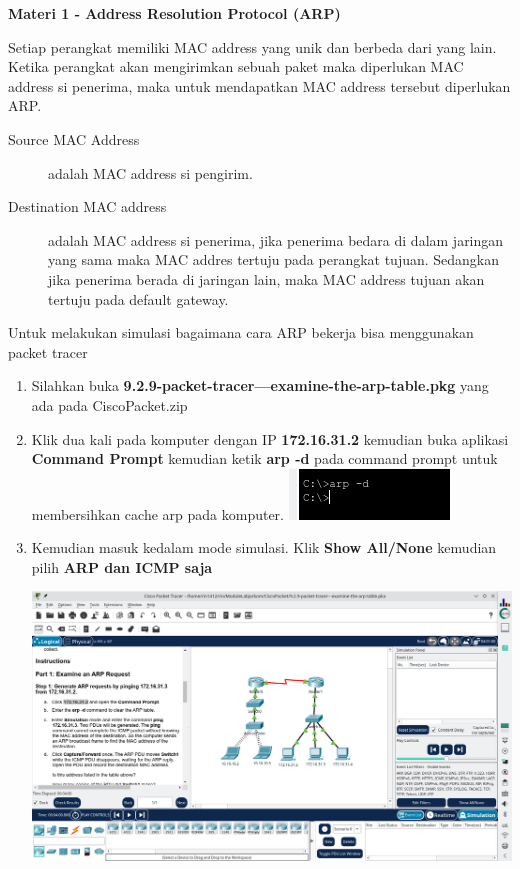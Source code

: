 \documentclass{article}
\begin{document}
    \begin{flushleft}
        \textbf{Materi 1 - Address Resolution Protocol (ARP)}
        \newline

        Setiap perangkat memiliki MAC address yang unik dan berbeda dari yang lain. Ketika perangkat akan mengirimkan sebuah paket maka diperlukan MAC address si penerima, maka untuk mendapatkan MAC address tersebut diperlukan ARP.
        \begin{description}
            \item[Source MAC Address] adalah MAC address si pengirim.
            \item[Destination MAC address] adalah MAC address si penerima, jika penerima bedara di dalam jaringan yang sama maka MAC addres tertuju pada perangkat tujuan.
            Sedangkan jika penerima berada di jaringan lain, maka MAC address tujuan akan tertuju pada default gateway.
        \end{description}

        Untuk melakukan simulasi bagaimana cara ARP bekerja bisa menggunakan packet tracer
        \begin{enumerate}
            \item Silahkan buka \textbf{9.2.9-packet-tracer---examine-the-arp-table.pkg} yang ada pada CiscoPacket.zip
            \item Klik dua kali pada komputer dengan IP \textbf{172.16.31.2} kemudian buka aplikasi \textbf{Command Prompt} kemudian ketik \textbf{arp -d} pada command prompt untuk membersihkan cache arp pada komputer.
            \includegraphics[scale=1.5]{1-arp-d.png}

            \item Kemudian masuk kedalam mode simulasi. Klik \textbf{Show All/None} kemudian pilih \textbf{ARP dan ICMP saja}
            
            \includegraphics[scale=0.3]{1-sim.png}
            

\end{enumerate}
\end{flushleft}
\end{document}
